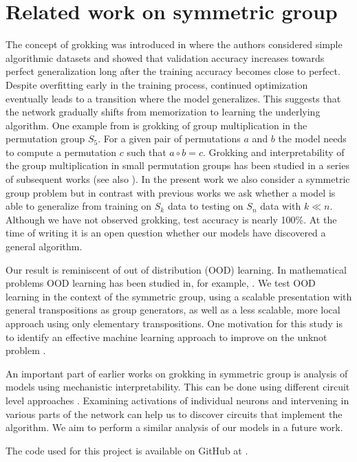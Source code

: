\section{Related work on symmetric group}
The concept of grokking was introduced in \cite{Power2022} where the authors considered simple algorithmic datasets and showed that validation accuracy increases towards perfect generalization long after the training accuracy becomes close to perfect. Despite overfitting early in the training process, continued optimization eventually leads to a transition where the model generalizes. This suggests that the network gradually shifts from memorization to learning the underlying algorithm. One example from \cite{Power2022} is grokking of group multiplication in the permutation group $S_5$. For a given pair of permutations  $a$ and $b$ the model needs to compute a permutation $c$ such that $a\circ b = c$. Grokking and interpretability of the group multiplication in small permutation groups has been studied in a series of subsequent works \cite{ChughtaiCN2021,StanderYFB2023,Wu2024} (see also \cite{NandaCLSS2023}). In the present work we also consider a symmetric group problem but in contrast with previous works we ask whether a model is able to generalize from training on $S_k$ data to testing on $S_n$ data with $k\ll n$. Although we have not observed grokking, test accuracy is nearly 100\%. At the time of writing it is an open question whether our models have discovered a general algorithm.

Our result is reminiscent of out of distribution (OOD) learning. In mathematical problems OOD learning has been studied in, for example, \cite{Charton2022}. We test OOD learning in the context of the symmetric group, using a scalable presentation with general transpositions as group generators, as well as a less scalable, more local approach using only elementary transpositions. One motivation for this study is to identify an effective machine learning approach to improve on the unknot problem \cite{GukovHRS:2020}.

An important part of earlier works on grokking in symmetric group is analysis of models using mechanistic interpretability. This can be done using different circuit level approaches \cite{Olah2020,Elhage2021,Olsson2022,Quirke2024,Zhang2023,Zhong2023,Gross2024}. Examining activations of individual neurons and intervening in various parts of the network can help us to discover circuits that implement the algorithm. We aim to perform a similar analysis of our models in a future work.

The code used for this project is available on GitHub at \cite{Petschack_github}.